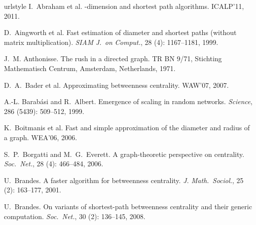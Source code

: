 \begin{thebibliography}{35}
\providecommand{\natexlab}[1]{#1}
\providecommand{\url}[1]{\texttt{#1}}
\expandafter\ifx\csname urlstyle\endcsname\relax
  \providecommand{\doi}[1]{doi: #1}\else
  \providecommand{\doi}{doi: \begingroup \urlstyle{rm}\Url}\fi
\vspace{-5pt}
I.~Abraham et al.
-dimension and shortest path algorithms.
\newblock ICALP'11, 2011.

D.~Aingworth et al.
\newblock Fast estimation of diameter and shortest paths (without matrix
  multiplication).
\newblock \emph{SIAM J.~on Comput.}, 28 (4): 1167--1181, 1999.

J.~M. Anthonisse.
\newblock The rush in a directed graph.
\newblock TR BN 9/71, Stichting Mathematisch Centrum, Amsterdam,
  Netherlands, 1971.

D.~A.~Bader et al.
\newblock Approximating betweenness centrality.
\newblock WAW'07, 2007.

A.-L. Barab{\'a}si and R.~Albert.
\newblock Emergence of scaling in random networks.
\newblock \emph{Science}, 286 (5439): 509--512, 1999.

K.~Boitmanis et al.
\newblock Fast and simple approximation of the diameter and radius of a graph.
\newblock WEA'06, 2006.

S.~P.~Borgatti and M.~G.~Everett.
\newblock A graph-theoretic perspective on centrality.
\newblock \emph{Soc.~Net.}, 28 (4): 466--484, 2006.

U.~Brandes.
\newblock A faster algorithm for betweenness centrality.
\newblock \emph{J. Math.~Sociol.}, 25 (2): 163--177, 2001.

U.~Brandes.
\newblock On variants of shortest-path betweenness centrality and their generic
  computation.
\newblock \emph{Soc.~Net.}, 30 (2): 136--145, 2008.


\end{thebibliography}
